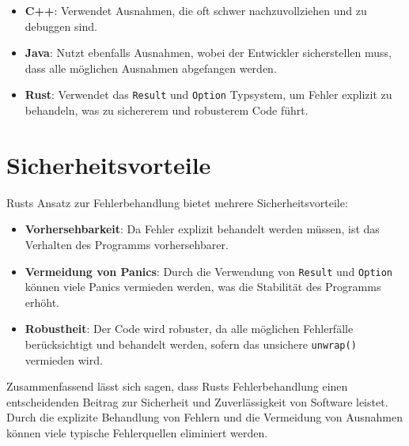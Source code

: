 \begin{itemize}
    \item \textbf{C++}: Verwendet Ausnahmen, die oft schwer nachzuvollziehen und zu debuggen sind.
    \item \textbf{Java}: Nutzt ebenfalls Ausnahmen, wobei der Entwickler sicherstellen muss, dass alle möglichen Ausnahmen abgefangen werden.
    \item \textbf{Rust}: Verwendet das \texttt{Result} und \texttt{Option} Typsystem, um Fehler explizit zu behandeln, was zu sichererem und robusterem Code führt.
\end{itemize}

\section{Sicherheitsvorteile}
Rusts Ansatz zur Fehlerbehandlung bietet mehrere Sicherheitsvorteile:

\begin{itemize}
    \item \textbf{Vorhersehbarkeit}: Da Fehler explizit behandelt werden müssen, ist das Verhalten des Programms vorhersehbarer.
    \item \textbf{Vermeidung von Panics}: Durch die Verwendung von \texttt{Result} und \texttt{Option} können viele Panics vermieden werden, was die Stabilität des Programms erhöht.
    \item \textbf{Robustheit}: Der Code wird robuster, da alle möglichen Fehlerfälle berücksichtigt und behandelt werden, sofern das unsichere \texttt{unwrap()} vermieden wird.
\end{itemize}
\noindent
Zusammenfassend lässt sich sagen, dass Rusts Fehlerbehandlung einen entscheidenden Beitrag zur Sicherheit und Zuverlässigkeit von Software leistet. Durch die explizite Behandlung von Fehlern und die Vermeidung von Ausnahmen können viele typische Fehlerquellen eliminiert werden.

